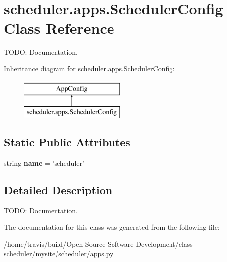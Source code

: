 \hypertarget{classscheduler_1_1apps_1_1_scheduler_config}{\section{scheduler.\-apps.\-Scheduler\-Config Class Reference}
\label{classscheduler_1_1apps_1_1_scheduler_config}
}


T\-O\-D\-O\-: Documentation.  


Inheritance diagram for scheduler.\-apps.\-Scheduler\-Config\-:\begin{figure}[H]
\begin{center}
\leavevmode
\includegraphics[height=2.000000cm]{classscheduler_1_1apps_1_1_scheduler_config}
\end{center}
\end{figure}
\subsection*{Static Public Attributes}
\begin{DoxyCompactItemize}
\item 
\hypertarget{classscheduler_1_1apps_1_1_scheduler_config_aebb64410f42031cde5364a964e8c85b3}{string {\bfseries name} = 'scheduler'}\label{classscheduler_1_1apps_1_1_scheduler_config_aebb64410f42031cde5364a964e8c85b3}

\end{DoxyCompactItemize}


\subsection{Detailed Description}
T\-O\-D\-O\-: Documentation. 

The documentation for this class was generated from the following file\-:\begin{DoxyCompactItemize}
\item 
/home/travis/build/\-Open-\/\-Source-\/\-Software-\/\-Development/class-\/scheduler/mysite/scheduler/apps.\-py\end{DoxyCompactItemize}
